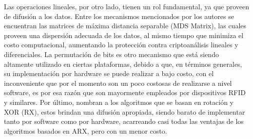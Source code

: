 \documentclass[a4paper,10pt]{article}
\begin{document}
	Las operaciones lineales, por otro lado, tienen un rol fundamental, ya que proveen de difusión a los datos. Entre los mecanismos mencionados por los autores se encuentran las matrices de máxima distancia separable (MDS Matrix), las cuales proveen una dispersión adecuada de los datos, al mismo tiempo que minimiza el costo computacional, aumentando la protección contra criptoanálisis lineales y diferenciales. La permutación de bits es otro mecanismo que está siendo altamente utilizado en ciertas plataformas, debido a que, en términos generales, su implementación por hardware se puede realizar a bajo costo, con el inconveniente que por el momento son un poco costosas de realizarse a nivel software, es por esa razón que son mayormente empleados por dispositivos RFID y similares. Por último, nombran a los algoritmos que se basan en rotación y XOR (RX), estos brindan una difusión apropiada, siendo barato de implementar tanto por software como por hardware, acarreando casi todas las ventajas de los algoritmos basados en ARX, pero con un menor costo.
	
\end{document}
